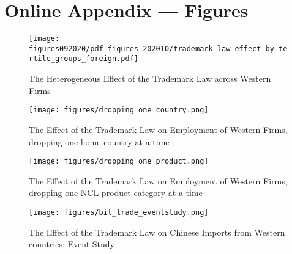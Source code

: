 \documentclass[12pt]{article}
\begin{document}
\clearpage

\newpage

\section{Online Appendix --- Figures}

\begin{figure}[ht]
    \centering
    \texttt{[image: figures092020/pdf\_figures\_202010/trademark\_law\_effect\_by\_tertile\_groups\_foreign.pdf]}   
    \caption{The Heterogeneous Effect of the Trademark Law across Western Firms}
    \label{fig:westerntertile}            
\end{figure}


\begin{figure}[hbt!]
    \centering
    \texttt{[image: figures/dropping\_one\_country.png]}   
    \caption{The Effect of the Trademark Law on Employment of Western Firms, dropping one home country at a time}
    \label{fig:dropcountry} 
\end{figure}

\begin{figure}[hbt!]
    \centering
    \texttt{[image: figures/dropping\_one\_product.png]}   
    \caption{The Effect of the Trademark Law on Employment of Western Firms, dropping one NCL product category at a time}
    \label{fig:dropproduct} 
\end{figure}

\begin{figure}[ht]
    \centering
    \texttt{[image: figures/bil\_trade\_eventstudy.png]}   
    \caption{The Effect of the Trademark Law on Chinese Imports from Western countries: Event Study}
    \label{fig:importevent} 
\end{figure}

\begin{figure}[ht]
\end{figure}
\end{document}
